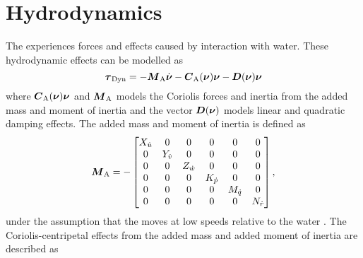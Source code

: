 \section{Hydrodynamics} 
The \abbrROV experiences forces and effects caused by interaction with water. These hydrodynamic effects can be modelled as 
\begin{equation}\label{eq:dyn}
 \boldsymbol{\tau}_\text{{Dyn}}=-\boldsymbol{M}_{\text{A}} \dot{\boldsymbol{\nu}} -\boldsymbol{C}_{\text{A}}(\boldsymbol{\nu})\boldsymbol{\nu} - \boldsymbol{D}(\boldsymbol{\nu})\boldsymbol{\nu}  
\end{equation} 
where $\boldsymbol{C}_{\text{A}}(\boldsymbol{\nu})\boldsymbol{\nu}$ and $\boldsymbol{M}_{\text{A}}$ models the Coriolis forces and inertia from the added mass and moment of inertia and the vector $\boldsymbol{D}(\boldsymbol{\nu})$ models linear and quadratic damping effects.
The added mass and moment of inertia is defined as
\begin{equation}
\boldsymbol{M}_\text{A} =
-\begin{bmatrix}
    X_{\dot{u}} & 0 & 0 & 0 & 0 & 0 \\
    0 & Y_{\dot{v}} & 0 & 0 & 0 & 0 \\
    0 & 0 & Z_{\dot{w}} & 0 & 0 & 0 \\
    0 & 0 & 0 & K_{\dot{p}}& 0 & 0 \\
    0 & 0 & 0 & 0 & M_{\dot{q}} & 0 \\
    0 & 0 & 0 & 0 & 0 & N_{\dot{r}} \\
    \end{bmatrix},
\end{equation}
under the assumption that the \abbrROV moves at low speeds relative to the water \citep[p. 121]{fossen2011}.
The Coriolis-centripetal effects from the added mass and added moment of inertia are described as
